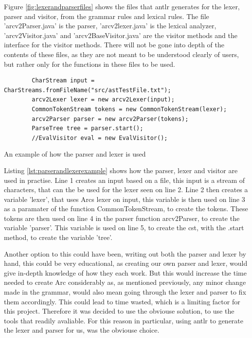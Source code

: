 Figure \ref{fig:lexerandparserfiles} shows the files that \gls{antlr} generates for the lexer, parser and visitor, from the grammar rules and lexical rules. The file 'arcv2Parser.java' is the parser, 'arcv2lexer.java' is the lexical analyzer, 'arcv2Visitor.java' and 'arcv2BaseVisitor.java' are the visitor methods and the interface for the visitor methods. There will not be gone into depth of the contents of these files, as they are not meant to be understood clearly of users, but rather only for the functions in these files to be used. 


\begin{listing}[htb!]
    \begin{verbatim}
        CharStream input = CharStreams.fromFileName("src/astTestFile.txt");
        arcv2Lexer lexer = new arcv2Lexer(input);
        CommonTokenStream tokens = new CommonTokenStream(lexer);
        arcv2Parser parser = new arcv2Parser(tokens);
        ParseTree tree = parser.start();
        //EvalVisitor eval = new EvalVisitor();
    \end{verbatim}
    \caption{An example of how the parser and lexer is used}
    \label{lst:parserandlexerexample}
\end{listing}


Listing \ref{lst:parserandlexerexample} shows how the parser, lexer and visitor are used in practise. Line 1 creates an input based on a file, this input is a stream of characters, that can the be used for the lexer seen on line 2. Line 2 then creates a variable 'lexer', that uses Arcs lexer on input, this variable is then used on line 3 as a paramater of the function CommonTokenStream, to create the tokens. These tokens are then used on line 4 in the parser function arcv2Parser, to create the variable 'parser'. This variable is used on line 5, to create the \gls{cst}, with the .start method, to create the variable 'tree'. 


Another option to this could have been, writing out both the parser and lexer by hand, this could be very educational, as creating our own parser and lexer, would give in-depth knowledge of how they each work. But this would increase the time needed to create Arc considerably as, as mentioned previously, any minor change made in the grammar, would also mean going through the lexer and parser to fix them accordingly. This could lead to time wasted, which is a limiting factor for this project. Therefore it was decided to use the obviouse solution, to use the tools that readily avaliable. For this reason in particular, using \gls{antlr} to generate the lexer and parser for us, was the obviouse choice.

